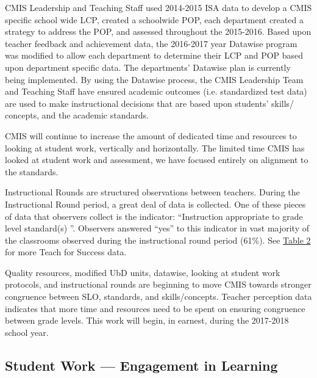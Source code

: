 \begin{findings}
CMIS Leadership and Teaching Staff used 2014-2015 ISA data to develop a CMIS specific school wide LCP, created a schoolwide POP, each department created a strategy to address the POP, and assessed throughout the 2015-2016. Based upon teacher feedback and achievement data, the 2016-2017 year Datawise program was modified to allow each department to determine their LCP and POP based upon department specific data. The departments’ Datawise plan is currently being implemented. By using the Datawise process, the CMIS Leadership Team and Teaching Staff have ensured academic outcomes (i.e. standardized test data) are used to make instructional decisions that are based upon students’ skills/ concepts, and the academic standards. 


CMIS will continue to increase the amount of  dedicated time and resources to looking at student work, vertically and horizontally. The limited time CMIS has looked at student work and assessment, we have focused entirely on alignment to the standards. 


Instructional Rounds are structured observations between teachers. During the Instructional Round period, a great deal of data is collected. One of these pieces of data that observers collect is the indicator:  “Instruction appropriate to grade level standard(s) ”. Observers answered “yes” to this  indicator in vast majority of the classrooms observed during the instructional round period (61\%). See \href{https://docs.google.com/a/cmis.ac.th/document/d/1cRvL50iIDvo8s1Gnxoczm82LhSVmEOvCrFksxzHD7ko/edit?usp=sharing}{Table 2} for more Teach for Success data. 


Quality resources, modified UbD units, datawise, looking at student work protocols, and instructional rounds are beginning to move CMIS towards stronger congruence between SLO, standards, and skills/concepts. Teacher perception data indicates that more time and resources need to be spent on ensuring congruence between grade levels. This work will begin, in earnest, during the 2017-2018 school year. 
\end{findings}

\subsection{Student Work — Engagement in Learning}

